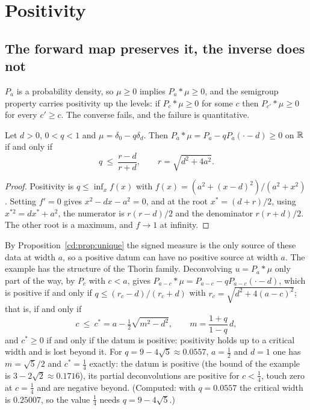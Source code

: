 \section{Positivity}\label{cd:sec:positivity}

\subsection{The forward map preserves it, the inverse does not}

$P_a$ is a probability density, so $\mu\ge0$ implies $P_a*\mu\ge0$, and the semigroup property carries positivity up the levels: if $P_c*\mu\ge0$ for some $c$ then $P_{c'}*\mu\ge0$ for every $c'\ge c$. The converse fails, and the failure is quantitative.

\begin{example}\label{cd:ex:signed}
Let $d>0$, $0<q<1$ and $\mu=\delta_0-q\delta_d$. Then $P_a*\mu=P_a-qP_a(\cdot-d)\ge0$ on $\mathbb{R}$ if and only if
\[
q\ \le\ \frac{r-d}{r+d},\qquad r=\sqrt{d^2+4a^2}.
\]
\end{example}

\begin{proof}
Positivity is $q\le\inf_xf(x)$ with $f(x)=(a^2+(x-d)^2)/(a^2+x^2)$. Setting $f'=0$ gives $x^2-dx-a^2=0$, and at the root $x^*=(d+r)/2$, using $x^{*2}=dx^*+a^2$, the numerator is $r(r-d)/2$ and the denominator $r(r+d)/2$. The other root is a maximum, and $f\to1$ at infinity.
\end{proof}

By Proposition~\ref{cd:prop:unique} the signed measure is the only source of these data at width $a$, so a positive datum can have no positive source at width $a$. The example has the structure of the Thorin family. Deconvolving $u=P_a*\mu$ only part of the way, by $P_c$ with $c<a$, gives $P_{a-c}*\mu=P_{a-c}-qP_{a-c}(\cdot-d)$, which is positive if and only if $q\le(r_c-d)/(r_c+d)$ with $r_c=\sqrt{d^2+4(a-c)^2}$; that is, if and only if
\[
c\ \le\ c^*=a-\tfrac12\sqrt{m^2-d^2},\qquad m=\frac{1+q}{1-q}\,d ,
\]
and $c^*\ge0$ if and only if the datum is positive: positivity holds up to a critical width and is lost beyond it. For $q=9-4\sqrt5\approx0.0557$, $a=\tfrac12$ and $d=1$ one has $m=\sqrt5/2$ and $c^*=\tfrac14$ exactly: the datum is positive (the bound of the example is $3-2\sqrt2\approx0.1716$), its partial deconvolutions are positive for $c<\tfrac14$, touch zero at $c=\tfrac14$ and are negative beyond. (Computed: with $q=0.0557$ the critical width is $0.25007$, so the value $\tfrac14$ needs $q=9-4\sqrt5$.)

